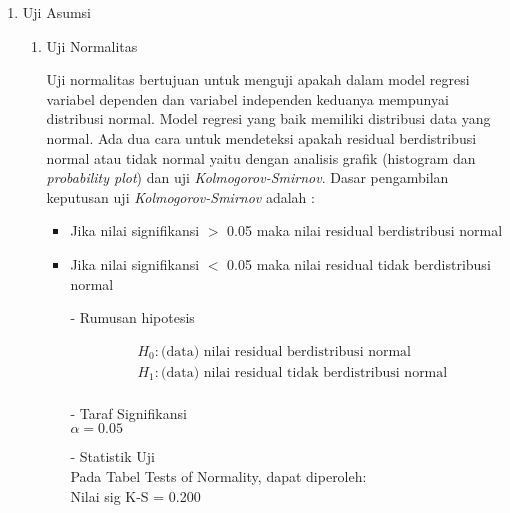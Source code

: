 \begin{enumerate}
\def\labelenumi{\arabic{enumi}.}
\tightlist
\item Uji Asumsi

    \begin{enumerate}
    \def\labelenumii{(\alph{enumii})}
    \tightlist
    \item Uji Normalitas \\
    \begin{sloppypar}
    Uji normalitas bertujuan untuk menguji apakah dalam model regresi variabel dependen dan variabel independen keduanya mempunyai distribusi normal. Model regresi yang baik memiliki distribusi data yang normal. Ada dua cara untuk mendeteksi apakah residual berdistribusi normal atau tidak normal yaitu dengan analisis grafik (histogram dan \textit{probability plot}) dan uji \textit{Kolmogorov-Smirnov}. Dasar pengambilan keputusan uji \textit{Kolmogorov-Smirnov} adalah :
    \end{sloppypar}
        \begin{itemize}
        \item Jika nilai signifikansi $>$ 0.05 maka nilai residual berdistribusi normal
        \item Jika nilai signifikansi $<$ 0.05 maka nilai residual tidak berdistribusi normal
        \end{itemize}
        \begin{test}{
            \begin{enumerate}
            \item[-] Rumusan hipotesis \\
            \begin{fleqn}[\parindent]
                \begin{equation*}
                \begin{split}
                &H_0 : \text{(data) nilai residual berdistribusi normal} \\ 
                &H_1 : \text{(data) nilai residual tidak berdistribusi normal} \\
                \end{split}
                \end{equation*}
            \end{fleqn}
        
            \item[-] Taraf Signifikansi \\
            $\alpha = 0.05$
        
            \item[-] Statistik Uji \\
            Pada Tabel Tests of Normality, dapat diperoleh: \\
            Nilai sig K-S = 0.200
        

\end{enumerate}}
\end{test}
\end{enumerate}
\end{enumerate}
